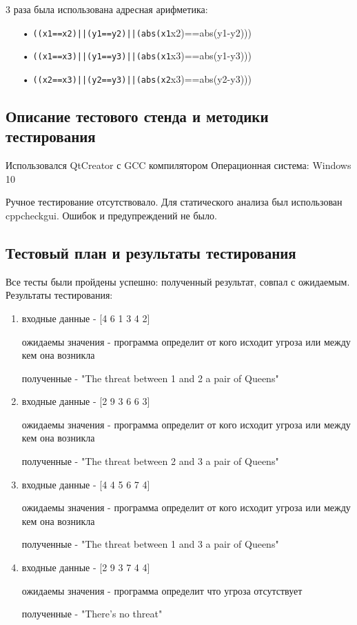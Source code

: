 \documentclass[12pt,a4paper]{report}
\begin{document}
3 раза была использована адресная арифметика:
\begin{enumerate}
\item[•] \verb-((x1==x2)||(y1==y2)||(abs(x1-x2)==abs(y1-y2)))
\item[•] \verb-((x1==x3)||(y1==y3)||(abs(x1-x3)==abs(y1-y3)))
\item[•] \verb-((x2==x3)||(y2==y3)||(abs(x2-x3)==abs(y2-y3)))
\end{enumerate}

\subsection{Описание тестового стенда и методики тестирования}
Использовался QtCreator с GCC компилятором
Операционная система: Windows 10


Ручное тестирование отсутствовало.
Для статического анализа был использован cppcheckgui. Ошибок и предупреждений не было.

\subsection{Тестовый план и результаты тестирования}
Все тесты были пройдены успешно: полученный результат, совпал с ожидаемым. Результаты тестирования:
\begin{enumerate}
\item входные данные - [4 6 1 3 4 2]

ожидаемы значения - программа определит от кого исходит угроза или между кем она возникла

полученные - "The threat between 1 and 2 a pair of Queens"

\item входные данные - [2 9 3 6 6 3]

ожидаемы значения - программа определит от кого исходит угроза или между кем она возникла

полученные - "The threat between 2 and 3 a pair of Queens"

\item входные данные - [4 4 5 6 7 4]

ожидаемы значения - программа определит от кого исходит угроза или между кем она возникла

полученные - "The threat between 1 and 3 a pair of Queens"

\item входные данные - [2 9 3 7 4 4]

ожидаемы значения - программа определит что угроза отсутствует

полученные - "There's no threat"

\end{enumerate}
\end{document}

